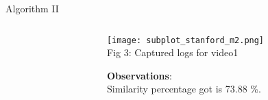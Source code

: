\documentclass{beamer}
\begin{document}
\begin{frame}{Algorithm II}
\begin{columns}
\begin{column}{0.5\textwidth}
\begin{algorithm}
\begin{algorithmic}
                \end{algorithmic}
            \end{algorithm}
            \hline
        \end{column}
        \begin{column}{0.5\textwidth}
            \begin{center}
                \texttt{[image: subplot\_stanford\_m2.png]} \\
                \footnotesize Fig 3: Captured logs for video1
            \end{center}
            \vspace{0.3em}
            \textbf{Observations}: \\
            Similarity percentage got is 73.88 \%.
        \end{column}
    \end{columns}
\end{frame}
\end{document}
